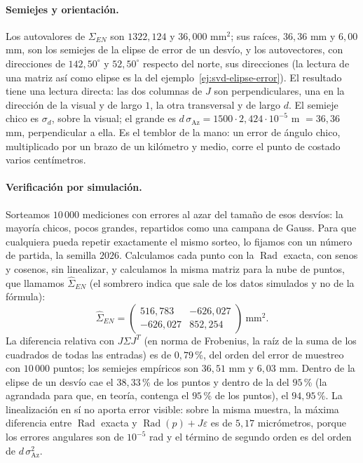 \paragraph{Semiejes y orientación.} Los autovalores de \(\Sigma_{EN}\) son \(1322{,}124\) y
\(36{,}000\) mm\(^2\); sus raíces, \(36{,}36\) mm y \(6{,}00\) mm, son los semiejes de la elipse
de error de un desvío, y los autovectores, con direcciones de \(142{,}50^\circ\) y
\(52{,}50^\circ\) respecto del norte,
sus direcciones (la lectura de una matriz así como elipse es la del
ejemplo~\ref{ej:svd-elipse-error}). El resultado tiene una lectura directa: las dos columnas de \(J\) son perpendiculares, una en la dirección de la visual y de
largo \(1\), la otra transversal y de largo \(d\). El semieje chico es \(\sigma_d\), sobre la
visual; el grande es \(d\,\sigma_{\mathrm{Az}}=1500\cdot2{,}424\cdot10^{-5}\) m \(=36{,}36\) mm,
perpendicular a ella. Es el temblor de la mano: un error de ángulo chico, multiplicado por un
brazo de un kilómetro y medio, corre el punto de costado varios centímetros.

\paragraph{Verificación por simulación.} Sorteamos \(10\,000\) mediciones con errores al
azar del tamaño de esos desvíos: la mayoría chicos, pocos grandes, repartidos como una campana
de Gauss. Para que cualquiera pueda repetir exactamente el mismo sorteo, lo fijamos con un número
de partida, la semilla \(2026\). Calculamos cada
punto con la \(\operatorname{Rad}\) exacta, con senos y cosenos, sin linealizar, y calculamos la misma matriz para
la nube de puntos, que llamamos \(\widehat\Sigma_{EN}\) (el sombrero indica que sale de los
datos simulados y no de la fórmula):
\[
  \widehat\Sigma_{EN}=\begin{pmatrix}516{,}783&-626{,}027\\-626{,}027&852{,}254\end{pmatrix}\ \text{mm}^2 .
\]
La diferencia relativa con \(J\Sigma J^T\) (en norma de Frobenius, la raíz de la suma de los
cuadrados de todas las entradas) es de \(0{,}79\)\,\%, del
orden del error de muestreo con \(10\,000\) puntos; los semiejes empíricos son \(36{,}51\) mm y
\(6{,}03\) mm. Dentro de la elipse de un desvío cae el \(38{,}33\)\,\% de los puntos y dentro de
la del \(95\)\,\% (la agrandada para que, en teoría, contenga el \(95\)\,\% de los puntos), el
\(94{,}95\)\,\%. La linealización en sí no aporta error visible: sobre la
misma muestra, la máxima diferencia entre \(\operatorname{Rad}\) exacta y \(\operatorname{Rad}(p)+J\varepsilon\) es de
\(5{,}17\) micrómetros, porque los errores angulares son de \(10^{-5}\) rad y el término de
segundo orden es del orden de \(d\,\sigma_{\mathrm{Az}}^2\).

